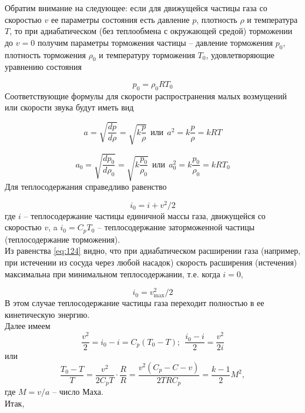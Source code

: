 \documentclass[specialist, subf, href, colorlinks=true, 14pt, final]{disser}
\theoremstyle{definition}
\begin{document}
Обратим внимание на следующее: если для движущейся частицы газа со скоростью $v$ ее параметры состояния есть давление $p$, плотность $\rho$ и температура $T$, то при адиабатическом (без теплообмена с окружающей средой) торможении до $v = 0$ получим параметры торможения частицы -- давление торможения $p_0$, плотность торможения $\rho_0$ и температуру торможения $T_0$, удовлетворяющие уравнению состояния
\addtocounter{equation}{1}
\begin{equation}\label{eq:122d}
  p_{0} = \rho_{0} R T_{0}
  \tag{2$'$}
\end{equation}
Соответствующие формулы для скорости распространения малых  возмущений или скорости звука будут иметь вид
\addtocounter{equation}{1}
\begin{equation}\label{eq:123}
  a = \sqrt{\frac{dp}{d\rho}} = \sqrt{k\frac{p}{\rho}}\ \ \text{или}\ \ a^{2} = k\frac{p}{\rho} = kRT
  \tag{3}
\end{equation}
\addtocounter{equation}{1}
\begin{equation}\label{eq:123d}
  a_{0} = \sqrt{\frac{dp_{0}}{d\rho_{0}}} = \sqrt{k\frac{p_{0}}{\rho_{0}}}\ \ \text{или}\ \ a_{0}^{2} = k\frac{p_{0}}{\rho_{0}} = kRT_{0}
  \tag{3$'$}
\end{equation}
Для теплосодержания справедливо равенство
\addtocounter{equation}{1}
\begin{equation}\label{eq:124}
  i_{0} = i + v^{2}/2
  \tag{4}
\end{equation}
где $i$ -- теплосодержание частицы единичной массы газа, движущейся со скоростью $v$, a $i_{0} = C_{p}T_{0}$ -- теплосодержание заторможенной частицы (теплосодержание торможения).\\
Из равенства \eqref{eq:124} видно, что при адиабатическом расширении
газа (например, при истечении из сосуда через любой насадок)
скорость расширения (истечения) максимальна при минимальном 
теплосодержании, т.е. когда $i = 0$,
\addtocounter{equation}{1}
\begin{equation}\label{eq:125}
  i_{0} = v_{\text{max}}^{2}/2
  \tag{5}
\end{equation}
В этом случае теплосодержание частицы газа переходит полностью
в ее кинетическую энергию.\\
Далее имеем
\[
  \frac{v^2}{2} = i_{0} - i = C_{p}(T_{0} - T);\ \ \frac{i_{0} - i}{2} = \frac{v^2}{2i}
\]
или
\[
  \frac{T_{0}-T}{T} = \frac{v^2}{2C_{p}T}\cdot\frac{R}{R} = \frac{v^{2}(C_{p}-C-{v})}{2TRC_p} = \frac{k-1}{2}M^{2},
\]
где $M = v/a$ -- число Маха.\\
Итак,
\addtocounter{equation}{1}
\end{document}
